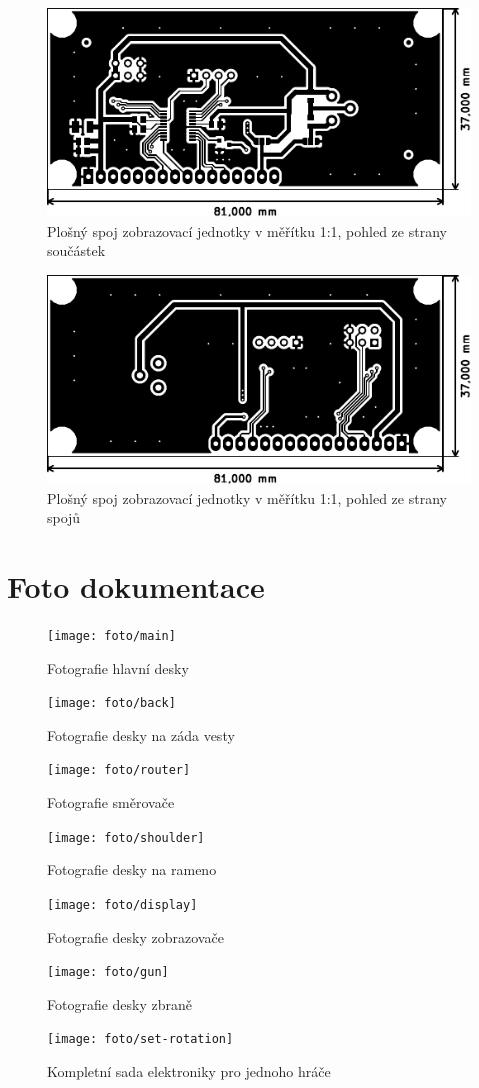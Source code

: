 \begin{figure}[h]
    \centering
    \includegraphics{pcb/display-top}
    \caption{Plošný spoj zobrazovací jednotky v měřítku 1:1, pohled ze strany součástek}
\end{figure}
\begin{figure}[h]
    \centering
    \includegraphics{pcb/display-bot}
    \caption{Plošný spoj zobrazovací jednotky v měřítku 1:1, pohled ze strany spojů}
\end{figure}


\chapter{Foto dokumentace}
\begin{figure}[h]
    \centering
    \texttt{[image: foto/main]}
    \caption{Fotografie hlavní desky}
\end{figure}
\begin{figure}[h]
    \centering
    \texttt{[image: foto/back]}
    \caption{Fotografie desky na záda vesty}
\end{figure}
\begin{figure}[h]
    \centering
    \texttt{[image: foto/router]}
    \caption{Fotografie směrovače}
\end{figure}
\begin{figure}[h]
    \centering
    \texttt{[image: foto/shoulder]}
    \caption{Fotografie desky na rameno}
\end{figure}
\begin{figure}[h]
    \centering
    \texttt{[image: foto/display]}
    \caption{Fotografie desky zobrazovače}
\end{figure}
\begin{figure}[h]
    \centering
    \texttt{[image: foto/gun]}
    \caption{Fotografie desky zbraně}
\end{figure}


\begin{figure}[h]
    \centering
    \texttt{[image: foto/set-rotation]}
    \caption{Kompletní sada elektroniky pro jednoho hráče}
\end{figure}
